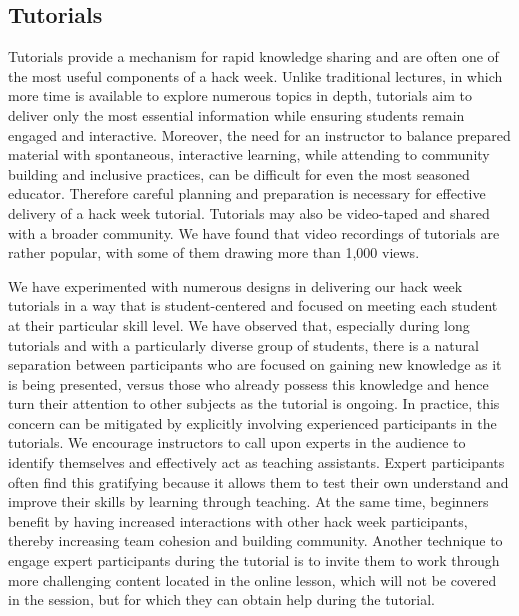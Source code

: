 \documentclass{nature}
\begin{document}
\subsection{Tutorials}
Tutorials provide a mechanism for rapid knowledge sharing and are often one of the most useful components of a hack week. Unlike traditional lectures, in which more time is available to explore numerous topics in depth, tutorials aim to deliver only the most essential information while ensuring students remain engaged and interactive. Moreover, the need for an instructor to balance prepared material with spontaneous, interactive learning, while attending to community building and inclusive practices, can be difficult for even the most seasoned educator. Therefore careful planning and preparation is necessary for effective delivery of a hack week tutorial. Tutorials may also be video-taped and shared with a broader community. We have found that video recordings of tutorials are rather popular, with some of them drawing more than 1,000 views.

We have experimented with numerous designs in delivering our hack week tutorials in a way that is student-centered and focused on meeting each student at their particular skill level. We have observed that, especially during long tutorials and with a particularly diverse group of students, there is a natural separation between participants who are focused on gaining new knowledge as it is being presented, versus those who already possess this knowledge and hence turn their attention to other subjects as the tutorial is ongoing. In practice, this concern can be mitigated by explicitly involving experienced participants in the tutorials. We encourage instructors to call upon experts in the audience to identify themselves and effectively act as teaching assistants. Expert participants often find this gratifying because it allows them to test their own understand and improve their skills by learning through teaching. At the same time, beginners benefit by having increased interactions with other hack week participants, thereby increasing team cohesion and building community. Another technique to engage expert participants during the tutorial is to invite them to work through more challenging content located in the online lesson, which will not be covered in the session, but for which they can obtain help during the tutorial.
\end{document}
